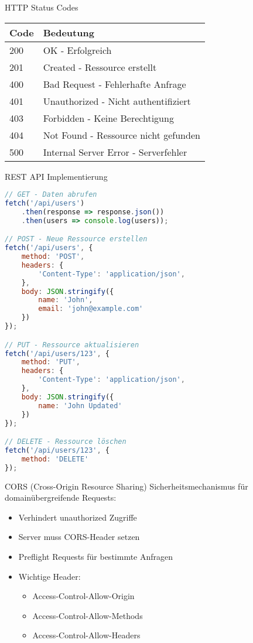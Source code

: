 \begin{theorem}{HTTP Status Codes}
    \begin{center}
    \begin{tabular}{|l|l|}
    \hline
    Code & Bedeutung \\
    \hline
    200 & OK - Erfolgreich \\
    \hline
    201 & Created - Ressource erstellt \\
    \hline
    400 & Bad Request - Fehlerhafte Anfrage \\
    \hline
    401 & Unauthorized - Nicht authentifiziert \\
    \hline
    403 & Forbidden - Keine Berechtigung \\
    \hline
    404 & Not Found - Ressource nicht gefunden \\
    \hline
    500 & Internal Server Error - Serverfehler \\
    \hline
    \end{tabular}
    \end{center}
\end{theorem}

\begin{KR}{REST API Implementierung}
\begin{lstlisting}[language=JavaScript, style=basesmol]
// GET - Daten abrufen
fetch('/api/users')
    .then(response => response.json())
    .then(users => console.log(users));

// POST - Neue Ressource erstellen
fetch('/api/users', {
    method: 'POST',
    headers: {
        'Content-Type': 'application/json',
    },
    body: JSON.stringify({
        name: 'John',
        email: 'john@example.com'
    })
});

// PUT - Ressource aktualisieren
fetch('/api/users/123', {
    method: 'PUT',
    headers: {
        'Content-Type': 'application/json',
    },
    body: JSON.stringify({
        name: 'John Updated'
    })
});

// DELETE - Ressource löschen
fetch('/api/users/123', {
    method: 'DELETE'
});
\end{lstlisting}
\end{KR}

\begin{concept}{CORS (Cross-Origin Resource Sharing)}
    Sicherheitsmechanismus für domainübergreifende Requests:
    \begin{itemize}
        \item Verhindert unauthorized Zugriffe
        \item Server muss CORS-Header setzen
        \item Preflight Requests für bestimmte Anfragen
        \item Wichtige Header:
            \begin{itemize}
                \item Access-Control-Allow-Origin
                \item Access-Control-Allow-Methods
                \item Access-Control-Allow-Headers
            \end{itemize}
    \end{itemize}
\end{concept}

